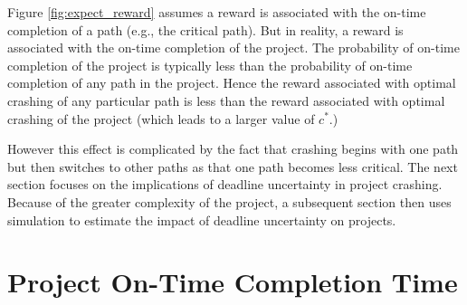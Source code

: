 \documentclass[11pt]{article}
\begin{document}
Figure \ref{fig:expect_reward} assumes a reward is associated with the on-time completion of a path (e.g., the critical path). But in reality, a reward is associated with the on-time completion of the project.  The probability of on-time completion of the project is typically less than the probability of on-time completion of any path in the project. Hence the reward associated with optimal crashing of any particular path is less than the reward associated with optimal crashing of the project (which leads to a larger value of  $c^*$.)\par
However this effect is complicated by the fact that crashing begins with one path but then switches to other paths as that one path becomes less critical.  The next section focuses on the implications of deadline uncertainty in project crashing.   Because of the greater complexity of the project, a subsequent section then uses simulation to estimate the impact of deadline uncertainty on projects.
\section{Project On-Time Completion Time}
\end{document}
